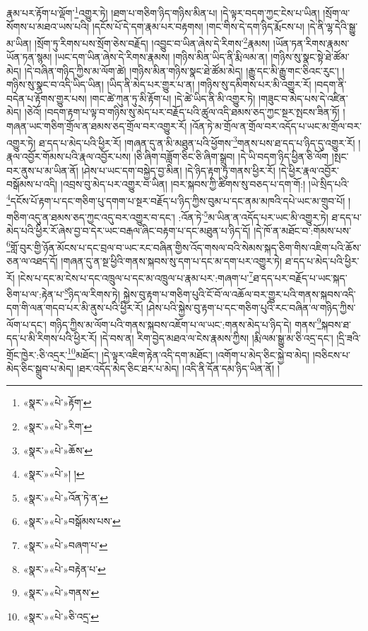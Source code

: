 རྣམ་པར་རྟོག་པ་ལྡོག་\footnote{«སྣར་»«པེ་»རྟོག་}འགྱུར་ཏེ། །ཐག་པ་གཅིག་ཉིད་གཉིས་མིན་པ། །དེ་ལྟར་བདག་ཀྱང་ངེས་པ་ཡིན། །སྲོག་ལ་སོགས་པ་མཐའ་ཡས་པའི། །དངོས་པོ་དེ་དག་རྣམ་པར་བརྟགས། །གང་གིས་དེ་དག་ཉིད་རྨོངས་པ། །དེ་ནི་ལྷ་དེའི་སྒྱུ་མ་ཡིན། །སྲོག་ཏུ་རིགས་པས་སྲོག་ཅེས་བརྗོད། །འབྱུང་བ་ཡིན་ཞེས་དེ་རིགས་\footnote{«སྣར་»«པེ་»རིག་}རྣམས། །ཡོན་ཏན་རིགས་རྣམས་ཡོན་ཏན་སྙམ། །ཡང་དག་ཡིན་ཞེས་དེ་རིགས་རྣམས། །གཉིས་མིན་ཡིད་ནི་རྨི་ལམ་ན། །གཉིས་སུ་སྣང་སྟེ་ཐེ་ཚོམ་མེད། །དེ་བཞིན་གཉིད་ཀྱིས་མ་ལོག་ཚེ། །གཉིས་མིན་གཉིས་སྣང་ཐེ་ཚོམ་མེད། །རྒྱུ་དང་མི་རྒྱུ་གང་ཅིའང་རུང་། །གཉིས་སུ་སྣང་བ་འདི་ཡིད་ཡིན། །ཡིད་ནི་མེད་པར་གྱུར་པ་ན། །གཉིས་སུ་དམིགས་པར་མི་འགྱུར་རོ། །བདག་ནི་བདེན་པ་རྟོགས་གྱུར་པས། །གང་ཚེ་ཀུན་ཏུ་མི་རྟོག་པ། །དེ་ཚེ་ཡིད་ནི་མི་འགྱུར་ཏེ། །གཟུང་བ་མེད་པས་དེ་འཛིན་མེད། །ཅེའོ། །བདག་རྟག་པ་ལྟ་བ་གཉིས་སུ་མེད་པར་བརྗོད་པའི་ཚུལ་འདི་ཐམས་ཅད་ཀྱང་སྔར་སྤངས་ཟིན་ཏོ། །གཞན་ཡང་གཅིག་གྲོལ་ན་ཐམས་ཅད་གྲོལ་བར་འགྱུར་རོ། །འོན་ཏེ་མ་གྲོལ་ན་གྲོལ་བར་འདོད་པ་ཡང་མ་གྲོལ་བར་འགྱུར་ཏེ། ཐ་དད་པ་མེད་པའི་ཕྱིར་རོ། །གཞན་དུ་ན་མི་མཐུན་པའི་ཕྱོགས་\footnote{«སྣར་»«པེ་»ཆོས་}གནས་པས་ཐ་དད་པ་ཉིད་དུ་འགྱུར་རོ། །རྣལ་འབྱོར་གོམས་པའི་རྣལ་འབྱོར་པས། །ཅི་ཞིག་བཟློག་ཅིང་ཅི་ཞིག་སྒྲུབ། །དེ་ཡི་བདག་ཉིད་ཕྱིན་ཅི་ལོག །སྤང་བར་ནུས་པ་མ་ཡིན་ནོ། །ཤེས་པ་ཡང་དག་བསྐྱེད་བྱ་མིན། །དེ་ཉིད་རྟག་ཏུ་གནས་ཕྱིར་རོ། །དེ་ཕྱིར་རྣལ་འབྱོར་བསྒོམས་པ་འདི། །འབྲས་བུ་མེད་པར་འགྱུར་བ་ཡིན། །བར་སྐབས་ཀྱི་ཚིགས་སུ་བཅད་པ་དག་གོ:། །ཡེ་སྲིད་པའི་\footnote{«སྣར་»«པེ་»། །}དངོས་པོ་རྟག་པ་དང་གཅིག་པུ་དགག་པ་སྔར་བརྗོད་པ་ཉིད་ཀྱིས་བུམ་པ་དང་ནམ་མཁའི་དཔེ་ཡང་མ་གྲུབ་པོ། །གཅིག་འདུ་ན་ཐམས་ཅད་ཀྱང་འདུ་བར་འགྱུར་བ་དང་། :འོན་ཏེ་\footnote{«སྣར་»«པེ་»འོན་ཏེ་ན་}མ་ཡིན་ན་འདོད་པར་ཡང་མི་འགྱུར་ཏེ། ཐ་དད་པ་མེད་པའི་ཕྱིར་རོ་ཞེས་བྱ་བ་དེར་ཡང་བརྒལ་ཞིང་བརྟག་པ་དང་མཐུན་པ་ཉིད་དོ། །དེ་ཁོ་ན་མཐོང་བ་:གོམས་པས་\footnote{«སྣར་»«པེ་»བསྒོམས་པས་}གློ་བུར་གྱི་ཉོན་མོངས་པ་དང་བྲལ་བ་ཡང་རང་བཞིན་གྱིས་འོད་གསལ་བའི་སེམས་སྐད་ཅིག་གིས་འཇིག་པའི་ཆོས་ཅན་ལ་འཐད་དོ། །གཞན་དུ་ན་སྔ་ཕྱིའི་གནས་སྐབས་སུ་དག་པ་དང་མ་དག་པར་འགྱུར་ཏེ། ཐ་དད་པ་མེད་པའི་ཕྱིར་རོ། །ངེས་པ་དང་མ་ངེས་པ་དང་འཁྲུལ་པ་དང་མ་འཁྲུལ་པ་རྣམ་པར་:གཞག་པ་\footnote{«སྣར་»«པེ་»བཞག་པ་}ཐ་དད་པར་བརྗོད་པ་ཡང་སྐད་ཅིག་པ་ལ་:རྟེན་པ་\footnote{«སྣར་»«པེ་»བརྟེན་པ་}ཉིད་ལ་རིགས་ཏེ། སྐྱེས་བུ་རྟག་པ་གཅིག་པུའི་ངོ་བོ་ལ་འཆོལ་བར་གྱུར་པའི་གནས་སྐབས་འདི་དག་གི་ལན་གདབ་པར་མི་ནུས་པའི་ཕྱིར་རོ། །ཤེས་པའི་སྐྱེས་བུ་རྟག་པ་དང་གཅིག་པུའི་རང་བཞིན་ལ་གཉིད་ཀྱིས་ལོག་པ་དང་། གཉིད་ཀྱིས་མ་ལོག་པའི་གནས་སྐབས་འཇོག་པ་ལ་ཡང་:གནས་མེད་པ་ཉིད་དེ། གནས་\footnote{«སྣར་»«པེ་»གནས་}སྐབས་ཐ་དད་པ་མི་རིགས་པའི་ཕྱིར་རོ། །དེ་བས་ན། རིག་བྱེད་མཐའ་ལ་ངེས་རྣམས་ཀྱིས། །རྨི་ལམ་སྒྱུ་མ་ཅི་འདྲ་དང་། །དྲི་ཟའི་གྲོང་ཁྱེར་:ཅི་འདྲར་\footnote{«སྣར་»«པེ་»ཅི་འདྲ་}མཐོང་། །དེ་ལྟར་འཇིག་རྟེན་འདི་དག་མཐོང་། །འགོག་པ་མེད་ཅིང་སྐྱེ་བ་མེད། །བཅིངས་པ་མེད་ཅིང་སྒྲུབ་པ་མེད། །ཐར་འདོད་མེད་ཅིང་ཐར་པ་མེད། །འདི་ནི་དོན་དམ་ཉིད་ཡིན་ནོ། །
